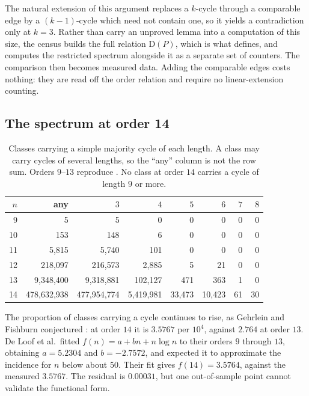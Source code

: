 \documentclass[11pt]{article}
\theoremstyle{definition}
\newcommand{\Dig}{\mathrm{D}}
\newcommand{\NCYCLIC}{478{,}632{,}938}
\newcommand{\CTHREE}{477{,}954{,}774}
\newcommand{\CFOUR}{5{,}419{,}981}
\newcommand{\CFIVE}{33{,}473}
\newcommand{\CSIX}{10{,}423}
\newcommand{\CSEVEN}{61}
\newcommand{\CEIGHT}{30}
\begin{document}
The natural extension of this argument replaces a $k$-cycle through a
comparable edge by a $(k-1)$-cycle which need not contain one, so it yields a
contradiction only at $k=3$.  Rather than carry an unproved lemma into a
computation of this size, the census builds the full relation $\Dig(P)$, which
is what \cite{deloof-census} defines, and computes the restricted spectrum
alongside it as a separate set of counters.  The comparison then becomes
measured data.  Adding the comparable edges costs nothing: they are read off
the order relation and require no linear-extension counting.

\subsection{The spectrum at order 14}

\begin{table}[ht]
\centering
\begin{tabular}{rrrrrrrr}
\toprule
$n$ & any & $3$ & $4$ & $5$ & $6$ & $7$ & $8$\\
\midrule
 9 & 5           & 5           & 0        & 0    & 0   & 0        & 0\\
10 & 153         & 148         & 6        & 0    & 0   & 0        & 0\\
11 & 5{,}815     & 5{,}740     & 101      & 0    & 0   & 0        & 0\\
12 & 218{,}097   & 216{,}573   & 2{,}885  & 5    & 21  & 0        & 0\\
13 & 9{,}348{,}400 & 9{,}318{,}881 & 102{,}127 & 471 & 363 & 1     & 0\\
14 & \NCYCLIC    & \CTHREE     & \CFOUR   & \CFIVE & \CSIX & \CSEVEN & \CEIGHT\\
\bottomrule
\end{tabular}
\caption{Classes carrying a simple majority cycle of each length.  A class may
carry cycles of several lengths, so the ``any'' column is not the row sum.
Orders $9$--$13$ reproduce \cite{deloof-census}.  No class at order $14$
carries a cycle of length $9$ or more.}
\label{tab:cycles}
\end{table}

The proportion of classes carrying a cycle continues to rise, as Gehrlein and
Fishburn conjectured \cite{gehrlein-fishburn}: at order $14$ it is $3.5767$
per $10^4$, against $2.764$ at order $13$.  De Loof et al.\ fitted
$f(n)=a+bn+n\log n$ to their orders $9$ through $13$, obtaining $a=5.2304$
and $b=-2.7572$, and expected it to approximate the incidence for $n$ below
about $50$.  Their fit gives $f(14)=3.5764$, against the measured $3.5767$.
The residual is $0.00031$, but one out-of-sample point cannot validate the
functional form.
\end{document}
